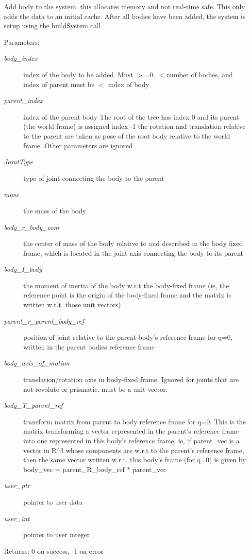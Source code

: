 Add body to the system. this allocates memory and not real-time safe. This only adds the data to an initial cache. After all bodies have been added, the system is setup using the buildSystem call \begin{Desc}
\item[Parameters:]
\begin{description}
\item[{\em body\_\-index}]index of the body to be added. Must $>$=0, $<$number of bodies, and index of parent must be $<$ index of body \item[{\em parent\_\-index}]index of the parent body The root of the tree has index 0 and its parent (the world frame) is assigned index -1 the rotation and translation relative to the parent are taken as pose of the root body relative to the world frame. Other parameters are ignored \item[{\em JointType}]type of joint connecting the body to the parent \item[{\em mass}]the mass of the body \item[{\em body\_\-r\_\-body\_\-com}]the center of mass of the body relative to and described in the body fixed frame, which is located in the joint axis connecting the body to its parent \item[{\em body\_\-I\_\-body}]the moment of inertia of the body w.r.t the body-fixed frame (ie, the reference point is the origin of the body-fixed frame and the matrix is written w.r.t. those unit vectors) \item[{\em parent\_\-r\_\-parent\_\-body\_\-ref}]position of joint relative to the parent body's reference frame for q=0, written in the parent bodies reference frame \item[{\em body\_\-axis\_\-of\_\-motion}]translation/rotation axis in body-fixed frame. Ignored for joints that are not revolute or prismatic. must be a unit vector. \item[{\em body\_\-T\_\-parent\_\-ref}]transform matrix from parent to body reference frame for q=0. This is the matrix transforming a vector represented in the parent's reference frame into one represented in this body's reference frame. ie, if parent\_\-vec is a vector in R$^\wedge$3 whose components are w.r.t to the parent's reference frame, then the same vector written w.r.t. this body's frame (for q=0) is given by body\_\-vec = parent\_\-R\_\-body\_\-ref $\ast$ parent\_\-vec \item[{\em user\_\-ptr}]pointer to user data \item[{\em user\_\-int}]pointer to user integer \end{description}
\end{Desc}
\begin{Desc}
\item[Returns:]0 on success, -1 on error \end{Desc}


